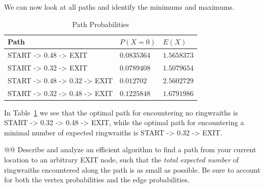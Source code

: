 \documentclass[10pt]{article}\usepackage[]{graphicx}\usepackage[]{xcolor}
\makeatletter
\newenvironment{kframe}{%
 \def\at@end@of@kframe{}%
 \ifinner\ifhmode%
  \def\at@end@of@kframe{\end{minipage}}%
  \begin{minipage}{\columnwidth}%
 \fi\fi%
 \def\FrameCommand##1{\hskip\@totalleftmargin \hskip-\fboxsep
 \colorbox{shadecolor}{##1}\hskip-\fboxsep
     \hskip-\linewidth \hskip-\@totalleftmargin \hskip\columnwidth}%
 \MakeFramed {\advance\hsize-\width
   \@totalleftmargin\z@ \linewidth\hsize
   \@setminipage}}%
 {\par\unskip\endMakeFramed%
 \at@end@of@kframe}
\newenvironment{knitrout}{}{} %
\makeatother
\begin{document}
\begin{easylist}[enumerate]
\begin{knitrout}
\begin{kframe}
{\ttfamily\noindent\bfseries{}}\end{kframe}
\end{knitrout}

    We can now look at all paths and identify the minimums and maximums.

    \begin{table}[H]
        \centering
        \begin{tabular}{|l|l|l|}
            \hline
            Path & $P(X=0)$ & $E(X)$\\
            \hline
            {\ttfamily START -> 0.48 -> EXIT} &
                $0.0835364$ &
                $1.5658373$\\
            \hline
            {\ttfamily START -> 0.32 -> EXIT} &
                $0.0789408$ &
                $1.5079654$\\
            \hline
            {\ttfamily START -> 0.48 -> 0.32 -> EXIT} &
                $0.012702$ &
                $2.5602729$\\
            \hline
            {\ttfamily START -> 0.32 -> 0.48 -> EXIT} &
                $0.1225848$ &
                $1.6791986$\\
            \hline
        \end{tabular}
        \caption{Path Probabilities}
        \label{table:ring_probs}
    \end{table}

    In Table~\ref{table:ring_probs} we see that the optimal path for encountering no ringwraiths is {\ttfamily START ->
    0.32 -> 0.48 -> EXIT}, while the optimal path for encountering a minimal number of expected ringwraiths is {\ttfamily START
    -> 0.32 -> EXIT}.

    @@ Describe and analyze an efficient algorithm to find a path from your current location to an arbitrary EXIT node,
    such that the \textit{total expected number} of ringwraiths encountered along the path is as small as possible. Be
    sure to account for both the vertex probabilities and the edge probabilities.


\end{easylist}
\end{document}
